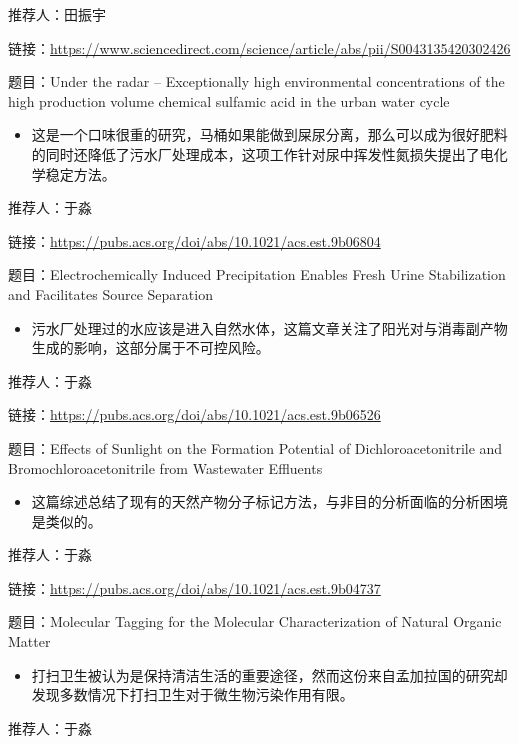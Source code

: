 \documentclass[
]{book}
\providecommand{\tightlist}{%
  \setlength{\itemsep}{0pt}\setlength{\parskip}{0pt}}
\begin{document}
推荐人：田振宇

链接：\url{https://www.sciencedirect.com/science/article/abs/pii/S0043135420302426}

题目：Under the radar -- Exceptionally high environmental concentrations of the high production volume chemical sulfamic acid in the urban water cycle

\begin{itemize}
\tightlist
\item
  这是一个口味很重的研究，马桶如果能做到屎尿分离，那么可以成为很好肥料的同时还降低了污水厂处理成本，这项工作针对尿中挥发性氮损失提出了电化学稳定方法。
\end{itemize}

推荐人：于淼

链接：\url{https://pubs.acs.org/doi/abs/10.1021/acs.est.9b06804}

题目：Electrochemically Induced Precipitation Enables Fresh Urine Stabilization and Facilitates Source Separation

\begin{itemize}
\tightlist
\item
  污水厂处理过的水应该是进入自然水体，这篇文章关注了阳光对与消毒副产物生成的影响，这部分属于不可控风险。
\end{itemize}

推荐人：于淼

链接：\url{https://pubs.acs.org/doi/abs/10.1021/acs.est.9b06526}

题目：Effects of Sunlight on the Formation Potential of Dichloroacetonitrile and Bromochloroacetonitrile from Wastewater Effluents

\begin{itemize}
\tightlist
\item
  这篇综述总结了现有的天然产物分子标记方法，与非目的分析面临的分析困境是类似的。
\end{itemize}

推荐人：于淼

链接：\url{https://pubs.acs.org/doi/abs/10.1021/acs.est.9b04737}

题目：Molecular Tagging for the Molecular Characterization of Natural Organic Matter

\begin{itemize}
\tightlist
\item
  打扫卫生被认为是保持清洁生活的重要途径，然而这份来自孟加拉国的研究却发现多数情况下打扫卫生对于微生物污染作用有限。
\end{itemize}

推荐人：于淼
\end{document}

